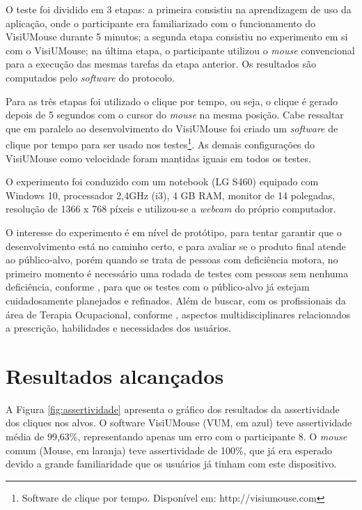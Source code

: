 O teste foi dividido em 3 etapas: a primeira consistiu na aprendizagem de uso da aplicação, onde o participante era familiarizado com o funcionamento do VisiUMouse durante 5 minutos; a segunda etapa consistiu no experimento em si com o VisiUMouse; na última etapa, o participante utilizou o \textit{mouse} convencional para a execução das mesmas tarefas da etapa anterior. Os resultados são computados pelo \textit{software} do protocolo.

Para as três etapas foi utilizado o clique por tempo, ou seja, 
o clique é gerado depois de 5 segundos com o cursor do \textit{mouse} na mesma posição. Cabe ressaltar que em paralelo ao desenvolvimento do VisiUMouse foi criado um \textit{software} de clique por tempo para ser usado nos testes\footnote{Software de clique por tempo. Disponível em: http://visiumouse.com}. As demais configurações do VisiUMouse como velocidade foram mantidas iguais em todos os testes.  

O experimento foi conduzido com um notebook (LG S460) equipado com Windows 10, processador 2,4GHz (i3), 4 GB RAM, monitor de 14 polegadas, resolução de 1366 x 768 píxeis e utilizou-se a \textit{webcam} do próprio computador.

O interesse do experimento é em nível de protótipo, para tentar garantir que o desenvolvimento está no caminho certo, e para avaliar se o produto final atende ao público-alvo, porém quando se trata de pessoas com deficiência motora, no primeiro momento é necessário uma rodada de testes com pessoas sem nenhuma deficiência, conforme \cite{stone2005user}, para que os testes com o público-alvo já estejam cuidadosamente planejados e refinados. Além de buscar, com os profissionais da área de Terapia Ocupacional, conforme \cite{oliveira2015uso}, aspectos multidisciplinares relacionados a prescrição, habilidades e necessidades dos usuários.

\section{Resultados alcançados}\label{Sub:resultados-ex-1}
A Figura \ref{fig:assertividade} apresenta o gráfico dos resultados da assertividade dos cliques nos alvos. O software VisiUMouse (VUM, em azul) teve assertividade média de 99,63\%, representando apenas um erro com o participante 8. O \textit{mouse} comum (Mouse, em laranja) teve assertividade de 100\%, que já era esperado devido a grande familiaridade que os usuários já tinham com este dispositivo.

